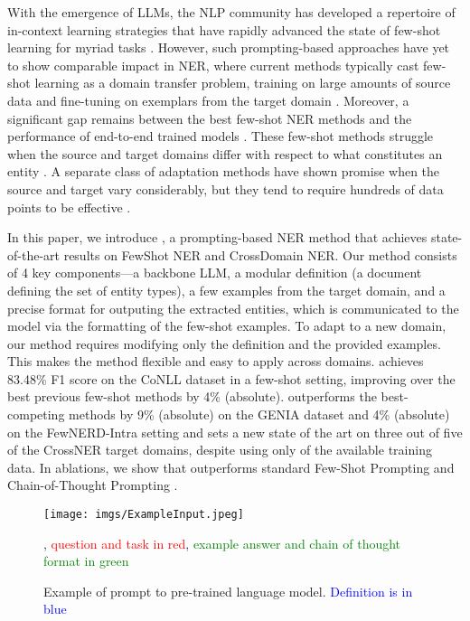 \documentclass[11pt]{article}
\begin{document}
With the emergence of LLMs, the NLP community 
has developed a repertoire of in-context learning strategies 
that have rapidly advanced the state of few-shot learning
for myriad tasks \citep{brown2020language, wei2022chain, liu2023pre}.
However, such prompting-based approaches have yet 
to show comparable impact in NER, 
where current methods typically cast few-shot learning 
as a domain transfer problem, training on large amounts of source data 
and fine-tuning on exemplars from the target domain \citep{huang2022copner, yang2022factmix}.
Moreover, a significant gap remains between the best few-shot NER methods
and the performance of end-to-end trained models \citep{wang2022deepstruct, xu2022clozing}.
These few-shot methods struggle when the source and target domains 
differ with respect to what constitutes an entity \citep{yang2022factmix, das2022container}. 
A separate class of adaptation methods have shown promise 
when the source and target vary considerably, 
but they tend to require hundreds of data points to be effective
\citep{hu2022label, chen2023one, hu2022entda, chen2022prompt}. 






In this paper, we introduce \toolname,
a prompting-based NER method
that achieves state-of-the-art results 
on FewShot NER and CrossDomain NER. 
Our method consists of 4 key components---a 
backbone LLM, a modular definition 
(a document defining the set of entity types), 
a few examples from the target domain, and a precise format for outputing
the extracted entities, which is communicated to the model
via the formatting of the few-shot examples. 
To adapt to a new domain, our method requires modifying
only the definition and the provided examples.
This makes the method flexible and easy to apply across domains.
\toolname achieves 83.48\% F1 score on the CoNLL dataset \citep{sang2003introduction} in a few-shot setting, improving over the best previous few-shot methods by 4\% (absolute). \toolname outperforms the best-competing methods by 9\% (absolute) on the GENIA \citep{kim2003genia} dataset and 4\% (absolute)
on the FewNERD-Intra \citep{ding2021few} setting
and sets a new state of the art on three out of five
of the CrossNER \citep{liu2021crossner} target domains,
despite using only  of the available training data.
In ablations, we show that \toolname outperforms
standard Few-Shot Prompting \citep{brown2020language} 
and Chain-of-Thought Prompting \citep{wei2022chain}.  

 
\begin{figure*}[th]
    \centering
    \texttt{[image: imgs/ExampleInput.jpeg]}
    \caption{Example of prompt to pre-trained language model. \textcolor{blue}{Definition is in blue}}, \textcolor{red}{question and task in red}, \textcolor{green}{example answer and chain of thought format in green}
    \label{fig:example}
\end{figure*}
\end{document}
